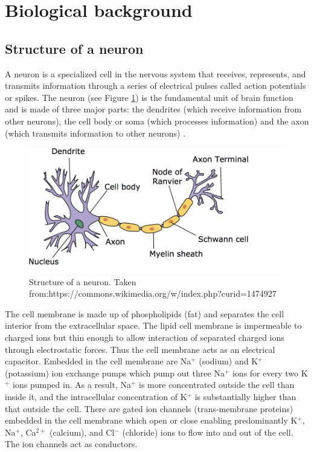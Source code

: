 \section{Biological background}
\subsection{Structure of a neuron}
A neuron is a specialized cell in the nervous system that receives, represents, and transmits information through a series of electrical pulses called action potentials or spikes. The neuron (see Figure \ref{fig:Neuron}) is the fundamental unit of brain function and is made of three major parts: the dendrites (which receive information from other neurons), the cell body or soma (which processes information) and the axon (which transmits information to other neurons) .

\begin{figure}[h]
\centering
\includegraphics[width=\textwidth]{./images/Neuron.png}
\caption{Structure of a neuron. Taken from:https://commons.wikimedia.org/w/index.php?curid=1474927}
      \label{fig:Neuron}
\end{figure}


The cell membrane is made up of phospholipids (fat) and separates the cell interior from the extracellular space. The lipid cell membrane is impermeable
to charged ions but thin enough to allow interaction of separated charged
ions through electrostatic forces. Thus the cell membrane acts as an electrical
capacitor. Embedded in the cell membrane are Na$^{+}$ (sodium) and K$^{+}$ (potassium) ion exchange pumps which pump out three Na$^{+}$ ions for every two K$^{+}$ ions pumped in. As a result, Na$^{+}$ is more concentrated outside the cell than inside it, and the intracellular concentration of K$^{+}$ is substantially higher than that outside the cell. There are gated ion channels
(trans-membrane proteins) embedded in the cell membrane which open or close enabling predominantly K$^{+}$, Na$^{+}$, Ca$^{2+}$ (calcium), and Cl$^{-}$ (chloride) ions to flow into and out of the cell. The ion channels act as conductors.

